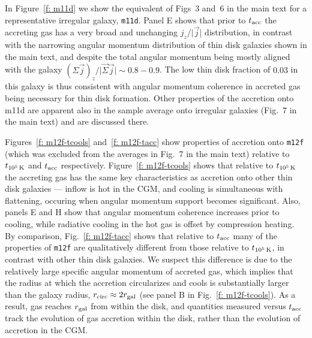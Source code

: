 \documentclass[class=article, crop=false]{standalone}
\newcommand{\tcools}{t_{10^5\,{\rm K}}}
\newcommand{\tacc}{t_{\rm acc}}
\newcommand{\Rcirc}[0]{r_{\rm circ}}
\begin{document}
In Figure~\ref{f: m11d} we show the equivalent of Figs~3 and~6 in the main text for a representative irregular galaxy, \texttt{m11d}.
Panel E shows that prior to $\tacc$ the accreting gas has a very broad and unchanging $j_z/\vert \vec j \vert$ distribution, in contrast with the narrowing angular momentum distribution of thin disk galaxies shown in the main text, and despite the total angular momentum being mostly aligned with the galaxy $(\Sigma \vec{j})_z / \vert \vec \Sigma\vec{j} \vert \sim 0.8-0.9$.
The low thin disk fraction of $0.03$ in this galaxy is thus  consistent with angular momentum coherence in accreted gas being necessary for thin disk formation. Other properties of the accretion onto m11d are apparent also in the sample average onto irregular galaxies (Fig.~7 in the main text) and are discussed there.

Figures~\ref{f: m12f-tcools} and~\ref{f: m12f-tacc} show properties of accretion onto \texttt{m12f} (which was excluded from the averages in Fig.~7 in the main text) relative to $\tcools$ and $\tacc$ respectively.
Figure~\ref{f: m12f-tcools} shows that relative to $\tcools$ the accreting gas has the same key characteristics as accretion onto other thin disk galaxies --- inflow is hot in the CGM, and cooling is simultaneous with flattening, occuring when angular momentum support becomes significant.
Also, panels E and H show that angular momentum coherence increases prior to cooling, while radiative cooling in the hot gas is offset by compression heating.
By comparison, Fig.~\ref{f: m12f-tacc} shows that relative to $\tacc$ many of the properties of \texttt{m12f} are qualitatively different from those relative to $\tcools$, in contrast with other thin disk galaxies.
We suspect this difference is due to the relatively large specific angular momentum of accreted gas, which implies that the radius at which the accretion circularizes and cools is substantially larger than the galaxy radius, $\Rcirc \approx 2 r_{\rm gal}$ (see panel B in Fig.~\ref{f: m12f-tcools}).
As a result, gas reaches $r_{\rm gal}$ from within the disk, and quantities measured versus $\tacc$ track the evolution of gas accretion within the disk, rather than the evolution of accretion in the CGM. 
\end{document}
